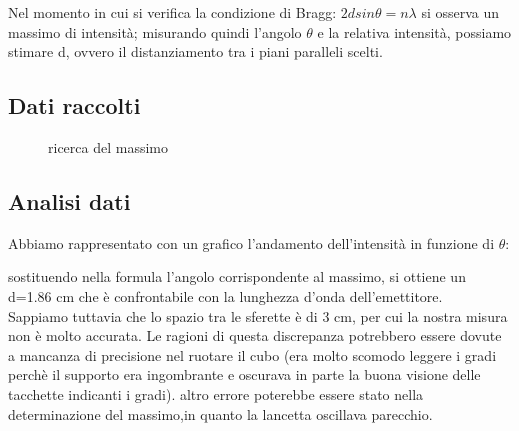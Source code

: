 \documentclass{article}
\theoremstyle{definition}
\begin{document}
\noindent Nel momento in cui si verifica la condizione di Bragg: \(   2 d sin \theta = n\lambda \)  si osserva un massimo di intensità; misurando quindi l'angolo $\theta$ e la relativa intensità, possiamo stimare d, ovvero il distanziamento tra i piani paralleli scelti.


\subsection{Dati raccolti}

\begin{figure}[!htbp]
    	\captionsetup{labelformat=empty}
        \caption{ricerca del massimo}
    	
\end{figure}

\pagebreak
\subsection{Analisi dati}

Abbiamo rappresentato con un grafico l'andamento dell'intensità in funzione di \(\theta\):

\begin{figure}[!ht]
    	\captionsetup{labelformat=empty}

\end{figure}

sostituendo nella formula l'angolo corrispondente al massimo, si ottiene un d=1.86 cm che è confrontabile con la lunghezza d'onda dell'emettitore. \\

Sappiamo tuttavia che lo spazio tra le sferette è di 3 cm, per cui la nostra misura non è molto accurata.
Le ragioni di questa discrepanza potrebbero essere dovute a mancanza di precisione nel ruotare il cubo (era molto scomodo leggere i gradi perchè il supporto era ingombrante e oscurava in parte la buona visione delle tacchette indicanti i gradi).
altro errore poterebbe essere stato nella determinazione del massimo,in quanto la lancetta oscillava parecchio.
\end{document}
